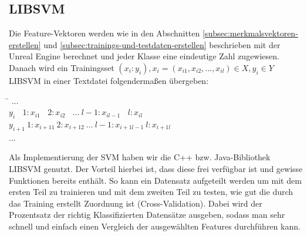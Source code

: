 \subsection{LIBSVM}
\label{subsec:libsvm}
Die Feature-Vektoren werden wie in den Abschnitten \ref{subsec:merkmalsvektoren-erstellen} und \ref{subsec:trainings-und-testdaten-erstellen} beschrieben mit der Unreal Engine berechnet und jeder Klasse eine eindeutige Zahl zugewiesen. Danach wird ein Trainingsset $(x_{i}:y_{i}), x_{i} = (x_{i1},x_{i2},...,x_{il}) \in X, y_{i} \in Y$ LIBSVM in einer Textdatei folgendermaßen übergeben:
\begin{tabbing}
\qquad \= $... $\\
\>$ y_{i}\ \ \ \ 1:x_{i1}\ \ \ \ 2:x_{i2}\ \ \ \ ...\ l-1:x_{il-1}\ \ \ \ l:x_{il} $\\
\>$ y_{i+1}\ 1:x_{i+11}\ 2:x_{i+12}\ ...\ l-1:x_{i+1l-1}\ l:x_{i+1l} $\\
\>$ ... $\\
\end{tabbing}
Als Implementierung der SVM haben wir die C++ bzw. Java-Bibliothek LIBSVM genutzt. Der Vorteil hierbei ist, dass diese frei verfügbar ist und gewisse Funktionen bereits enthält. So kann ein Datensatz aufgeteilt werden um mit dem ersten Teil zu trainieren und mit dem zweiten Teil zu testen, wie gut die durch das Training erstellt Zuordnung ist (Cross-Validation). Dabei wird der Prozentsatz der richtig Klassifizierten Datensätze ausgeben, sodass man sehr schnell und einfach einen Vergleich der ausgewählten Features durchführen kann. 

